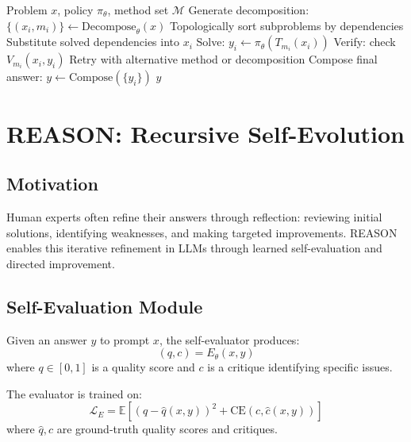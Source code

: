 \documentclass[11pt,a4paper]{article}
\newcommand{\E}{\mathbb{E}}
\begin{document}
\begin{algorithm}[t]
\caption{COMPASS Inference}
\label{alg:compass}
\begin{algorithmic}[1]
\REQUIRE Problem $x$, policy $\pi_\theta$, method set $\mathcal{M}$
\STATE Generate decomposition: $\{(x_i, m_i)\} \leftarrow \text{Decompose}_\theta(x)$
\STATE Topologically sort subproblems by dependencies
    \STATE Substitute solved dependencies into $x_i$
    \STATE Solve: $y_i \leftarrow \pi_\theta(T_{m_i}(x_i))$
    \STATE Verify: check $V_{m_i}(x_i, y_i)$
        \STATE Retry with alternative method or decomposition
    \ENDIF
\ENDFOR
\STATE Compose final answer: $y \leftarrow \text{Compose}(\{y_i\})$
\RETURN $y$
\end{algorithmic}
\end{algorithm}

\section{REASON: Recursive Self-Evolution}

\subsection{Motivation}

Human experts often refine their answers through reflection: reviewing initial solutions, identifying weaknesses, and making targeted improvements. REASON enables this iterative refinement in LLMs through learned self-evaluation and directed improvement.

\subsection{Self-Evaluation Module}

Given an answer $y$ to prompt $x$, the self-evaluator produces:
\begin{equation}
    (q, c) = E_\theta(x, y)
\end{equation}
where $q \in [0, 1]$ is a quality score and $c$ is a critique identifying specific issues.

The evaluator is trained on:
\begin{equation}
    \mathcal{L}_E = \E\left[(q - \hat{q}(x, y))^2 + \text{CE}(c, \hat{c}(x, y))\right]
\end{equation}
where $\hat{q}, \hat{c}$ are ground-truth quality scores and critiques.
\end{document}
